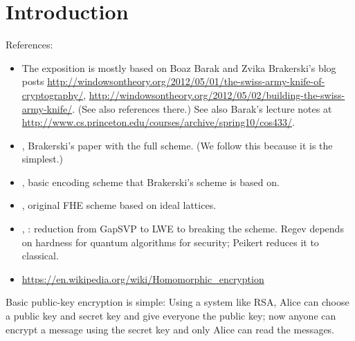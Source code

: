 \def\filepath{C:/Users/Owner/Dropbox/Math/templates}





%


%

\pagestyle{fancy}
\chead{} 
\rhead{} 
\lfoot{} 
\cfoot{\thepage} 
\rfoot{} 
\renewcommand{\headrulewidth}{.3pt} 
\setlength\voffset{0in}
\setlength\textheight{648pt}





\tableofcontents

\section{Introduction}


References:
\begin{itemize}
\item The exposition is mostly based on Boaz Barak and Zvika Brakerski's blog posts
\url{http://windowsontheory.org/2012/05/01/the-swiss-army-knife-of-cryptography/}, \url{http://windowsontheory.org/2012/05/02/building-the-swiss-army-knife/}. (See also references there.) See also Barak's lecture notes at \url{http://www.cs.princeton.edu/courses/archive/spring10/cos433/}.
\item \cite{Brakerski2012}, Brakerski's paper with the full scheme. (We follow this because it is the simplest.)
\item \cite{Regev2009}, basic encoding scheme that Brakerski's scheme is based on.
\item \cite{Gentry2009}, original FHE scheme based on ideal lattices.
\item \cite{Regev2009}, \cite{Peikert2009}: reduction from GapSVP to LWE to breaking the scheme. Regev depends on hardness for quantum algorithms for security; Peikert reduces it to classical.
\item \url{https://en.wikipedia.org/wiki/Homomorphic_encryption}
\end{itemize}

Basic public-key encryption is simple: Using a system like RSA, Alice can choose a public key and secret key and give everyone the public key; now anyone can encrypt a message using the secret key and only Alice can read the messages.

